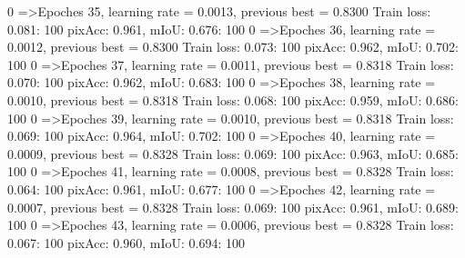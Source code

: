   0%
=>Epoches 35, learning rate = 0.0013,                 previous best = 0.8300
Train loss: 0.081: 100%
pixAcc: 0.961, mIoU: 0.676: 100%
  0%
=>Epoches 36, learning rate = 0.0012,                 previous best = 0.8300
Train loss: 0.073: 100%
pixAcc: 0.962, mIoU: 0.702: 100%
  0%
=>Epoches 37, learning rate = 0.0011,                 previous best = 0.8318
Train loss: 0.070: 100%
pixAcc: 0.962, mIoU: 0.683: 100%
  0%
=>Epoches 38, learning rate = 0.0010,                 previous best = 0.8318
Train loss: 0.068: 100%
pixAcc: 0.959, mIoU: 0.686: 100%
  0%
=>Epoches 39, learning rate = 0.0010,                 previous best = 0.8318
Train loss: 0.069: 100%
pixAcc: 0.964, mIoU: 0.702: 100%
  0%
=>Epoches 40, learning rate = 0.0009,                 previous best = 0.8328
Train loss: 0.069: 100%
pixAcc: 0.963, mIoU: 0.685: 100%
  0%
=>Epoches 41, learning rate = 0.0008,                 previous best = 0.8328
Train loss: 0.064: 100%
pixAcc: 0.961, mIoU: 0.677: 100%
  0%
=>Epoches 42, learning rate = 0.0007,                 previous best = 0.8328
Train loss: 0.069: 100%
pixAcc: 0.961, mIoU: 0.689: 100%
  0%
=>Epoches 43, learning rate = 0.0006,                 previous best = 0.8328
Train loss: 0.067: 100%
pixAcc: 0.960, mIoU: 0.694: 100%

